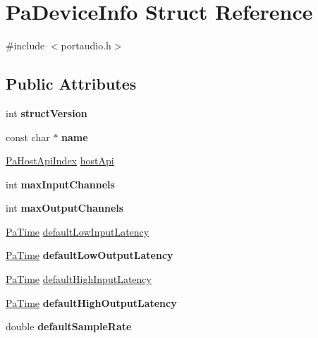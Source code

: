 \hypertarget{struct_pa_device_info}{\section{Pa\+Device\+Info Struct Reference}
\label{struct_pa_device_info}
}


{\ttfamily \#include $<$portaudio.\+h$>$}

\subsection*{Public Attributes}
\begin{DoxyCompactItemize}
\item 
\hypertarget{struct_pa_device_info_a2d726add4cd2af78a94c052b3a7df568}{int {\bfseries struct\+Version}}\label{struct_pa_device_info_a2d726add4cd2af78a94c052b3a7df568}

\item 
\hypertarget{struct_pa_device_info_a1bc26d68f1d89472ae67eaa49a542aea}{const char $\ast$ {\bfseries name}}\label{struct_pa_device_info_a1bc26d68f1d89472ae67eaa49a542aea}

\item 
\hyperlink{portaudio_8h_aeef6da084c57c70aa94be97411e19930}{Pa\+Host\+Api\+Index} \hyperlink{struct_pa_device_info_afe741e4d185069577f7e74b78fdef5a4}{host\+Api}
\item 
\hypertarget{struct_pa_device_info_ad0baeeb2b6ceaf7fc9bb76109a7555e9}{int {\bfseries max\+Input\+Channels}}\label{struct_pa_device_info_ad0baeeb2b6ceaf7fc9bb76109a7555e9}

\item 
\hypertarget{struct_pa_device_info_a48f908b21e8a11fdf0a88132b18fe7b0}{int {\bfseries max\+Output\+Channels}}\label{struct_pa_device_info_a48f908b21e8a11fdf0a88132b18fe7b0}

\item 
\hyperlink{portaudio_8h_af17a7e6d0471a23071acf8dbd7bbe4bd}{Pa\+Time} \hyperlink{struct_pa_device_info_aad6629064b8c7cf043d237ea0a5cc534}{default\+Low\+Input\+Latency}
\item 
\hypertarget{struct_pa_device_info_a89e60515505eea8d668ede3a26a19ac6}{\hyperlink{portaudio_8h_af17a7e6d0471a23071acf8dbd7bbe4bd}{Pa\+Time} {\bfseries default\+Low\+Output\+Latency}}\label{struct_pa_device_info_a89e60515505eea8d668ede3a26a19ac6}

\item 
\hyperlink{portaudio_8h_af17a7e6d0471a23071acf8dbd7bbe4bd}{Pa\+Time} \hyperlink{struct_pa_device_info_a4214826038fcaf374beb9816024e6c9f}{default\+High\+Input\+Latency}
\item 
\hypertarget{struct_pa_device_info_a2a43dbc2b158806a937065bda037070e}{\hyperlink{portaudio_8h_af17a7e6d0471a23071acf8dbd7bbe4bd}{Pa\+Time} {\bfseries default\+High\+Output\+Latency}}\label{struct_pa_device_info_a2a43dbc2b158806a937065bda037070e}

\item 
\hypertarget{struct_pa_device_info_a68f435353bfe1a4c9b632203a9afcacb}{double {\bfseries default\+Sample\+Rate}}\label{struct_pa_device_info_a68f435353bfe1a4c9b632203a9afcacb}

\end{DoxyCompactItemize}
